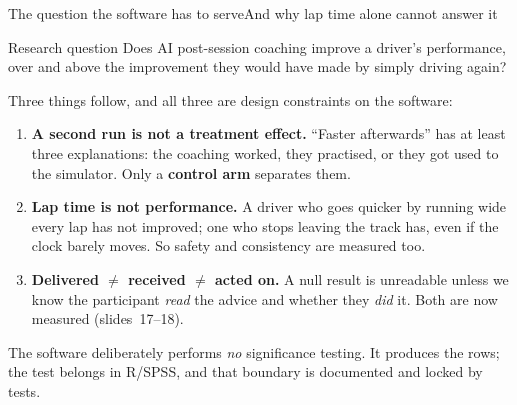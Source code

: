 \documentclass[aspectratio=169,10pt]{beamer}
\newcommand{\kw}[1]{\textcolor{cblue}{\textbf{#1}}}
\begin{document}
\begin{frame}{The question the software has to serve}{And why lap time alone cannot answer it}
  \begin{block}{\normalsize Research question}
    Does AI post-session coaching improve a driver's performance, over and above
    the improvement they would have made by simply driving again?
  \end{block}
  \vspace{0.5em}
  Three things follow, and all three are design constraints on the software:
  \begin{enumerate}\small
    \item[\textbf{1.}] \kw{A second run is not a treatment effect.} ``Faster afterwards''
      has at least three explanations: the coaching worked, they practised, or they
      got used to the simulator. Only a \kw{control arm} separates them.
    \item[\textbf{2.}] \kw{Lap time is not performance.} A driver who goes quicker by
      running wide every lap has not improved; one who stops leaving the track has,
      even if the clock barely moves. So safety and consistency are measured too.
    \item[\textbf{3.}] \kw{Delivered $\neq$ received $\neq$ acted on.} A null result is
      unreadable unless we know the participant \emph{read} the advice and whether
      they \emph{did} it. Both are now measured (slides~17--18).
  \end{enumerate}
  \vspace{0.4em}
  {\footnotesize\color{cgray} The software deliberately performs \emph{no} significance
  testing. It produces the rows; the test belongs in R/SPSS, and that boundary is
  documented and locked by tests.}
\end{frame}
\end{document}
